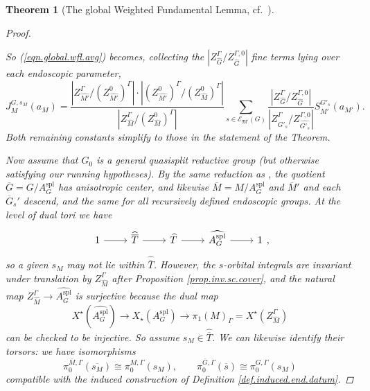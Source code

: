 \documentclass[openany]{amsbook}
\newtheorem{theorem}{Theorem}[chapter]
\theoremstyle{definition}
\theoremstyle{remark}
\numberwithin{equation}{section}
\newcommand{\cE}{\mathcal{E}}
\newcommand{\ol}[1]{\overline{#1}}
\renewcommand{\-}{\operatorname{-}}
\newcommand{\fM}{\mathfrak{M}}
\newcommand{\spl}{\mathrm{spl}}
\begin{document}
\begin{theorem}[{The global Weighted Fundamental Lemma, cf.\ \cite[Th\'eor\`eme 15.1.1]{CLII}}]
\begin{proof}
\begin{itemize}
    \end{itemize}
    So (\ref{eqn.global.wfl.avg}) becomes, collecting the $|Z^\Gamma_{\widehat{G}}/Z^{\Gamma,0}_{\widehat{G}}|$ fine terms lying over each endoscopic parameter,
    $$
        J_M^{G,{s_M}}(a_M) =         \frac{|Z^\Gamma_{\widehat{M'}}/(Z^0_{\widehat{M'}})^\Gamma| \cdot |(Z^0_{\widehat{M'}})^{\Gamma}/(Z^0_{\widehat{M}})^{\Gamma}|}{|Z_{\widehat{M}}^\Gamma/(Z^0_{\widehat{M}})^\Gamma|}
        \sum_{s \in \cE_{\fM'}(G)} \frac{|Z^\Gamma_{\widehat{G}}/Z^{\Gamma,0}_{\widehat{G}}|}{ |Z^\Gamma_{\widehat{G'_s}}/Z^{\Gamma,0}_{\widehat{G'_s}}|} S_{M'}^{G'_s}(a_{M'}).
    $$
    Both remaining constants simplify to those in the statement of the Theorem.

    Now assume that $G_0$ is a general quasisplit reductive group (but otherwise satisfying our running hypotheses). By the same reduction as \cite[\S 8.6.1]{ngofl}, the quotient $\ol{G} = G/A_G^{\spl}$ has anisotropic center, and likewise $\ol{M} = M/A_G^{\spl}$ and $\ol{M}'$ and each $\ol{G}_s'$ descend, and the same for all recursively defined endoscopic groups. At the level of dual tori we have
    $$
        \begin{tikzcd}[ampersand replacement=\&]
        1 \ar[r] \& \widehat{\ol{T}} \ar[r] \& \widehat{T} \ar[r] \& \widehat{A_G^\spl} \ar[r] \& 1
        \end{tikzcd},
    $$
    so a given $s_M$ may not lie within $\widehat{\ol{T}}$. However, the $s$-orbital integrals are invariant under translation by $Z_{\widehat{M}}^\Gamma$ after Proposition \ref{prop.inv.sc.cover}, and the natural map $Z_{\widehat{M}}^\Gamma \to \widehat{A_G^\spl}$ is surjective because the dual map $$X^\star(\widehat{A_G^\spl}) \to X_\star(A^\spl_G) \to \pi_1(M)_{\Gamma} = X^\star(Z_{\widehat{M}}^{\Gamma})$$ can be checked to be injective. So assume $s_M \in \widehat{\ol{T}}$. We can likewise identify their torsors: we have isomorphisms
    $$
        \pi_0^{\ol{M},\Gamma}(\ol{s_M}) \cong \pi_0^{M,\Gamma}(s_M), \qquad \pi_0^{\ol{G},\Gamma}(\ol{s}) \cong \pi_0^{G,\Gamma}(s_M)
    $$
    compatible with the induced construction of Definition \ref{def.induced.end.datum}.


\end{proof}
\end{theorem}
\end{document}
